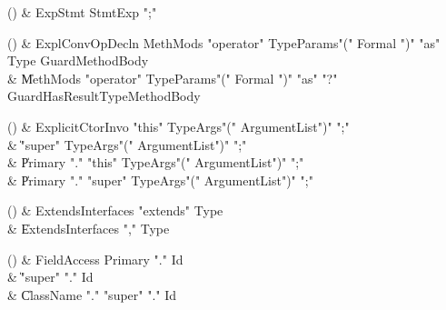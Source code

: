 \begin{bbgrammarappendix}{4.3in}

() & ExpStmt \label{prod:ExpStmt}  \: StmtExp \xcd";"  \\


\end{bbgrammarappendix}

\begin{bbgrammarappendix}{3.5in}

() & ExplConvOpDecln \label{prod:ExplConvOpDecln}  \: MethMods \xcd"operator" TypeParams\opt \xcd"(" Formal  \xcd")" \xcd"as" Type Guard\opt MethodBody  \\

 &    \| MethMods \xcd"operator" TypeParams\opt \xcd"(" Formal  \xcd")" \xcd"as" \xcd"?" Guard\opt HasResultType\opt MethodBody \\

\end{bbgrammarappendix}

\begin{bbgrammarappendix}{3.4in}

() & ExplicitCtorInvo \label{prod:ExplicitCtorInvo}  \: \xcd"this" TypeArgs\opt \xcd"(" ArgumentList\opt \xcd")" \xcd";"  \\

 &    \| \xcd"super" TypeArgs\opt \xcd"(" ArgumentList\opt \xcd")" \xcd";" \\
 &    \| Primary \xcd"." \xcd"this" TypeArgs\opt \xcd"(" ArgumentList\opt \xcd")" \xcd";" \\
 &    \| Primary \xcd"." \xcd"super" TypeArgs\opt \xcd"(" ArgumentList\opt \xcd")" \xcd";" \\

\end{bbgrammarappendix}

\begin{bbgrammarappendix}{3.3in}

() & ExtendsInterfaces \label{prod:ExtendsInterfaces}  \: \xcd"extends" Type  \\

 &    \| ExtendsInterfaces \xcd"," Type \\

\end{bbgrammarappendix}

\begin{bbgrammarappendix}{3.9in}

() & FieldAccess \label{prod:FieldAccess}  \: Primary \xcd"." Id  \\

 &    \| \xcd"super" \xcd"." Id \\
 &    \| ClassName \xcd"." \xcd"super"  \xcd"." Id \\

\end{bbgrammarappendix}

